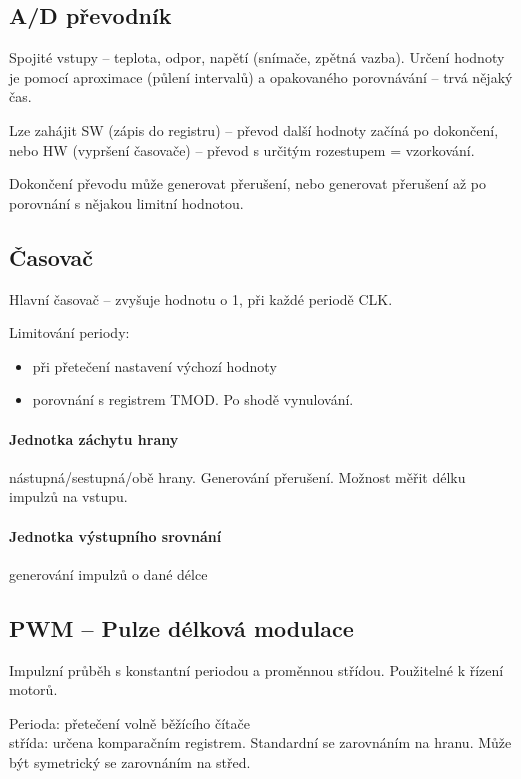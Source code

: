 \documentclass[a4paper, 11pt]{report}
\begin{document}
\subsection{A/D převodník}
Spojité vstupy -- teplota, odpor, napětí (snímače, zpětná vazba). Určení hodnoty je pomocí aproximace (půlení intervalů) a opakovaného porovnávání -- trvá nějaký čas.

Lze zahájit SW (zápis do registru) -- převod další hodnoty začíná po dokončení, nebo HW (vypršení časovače) -- převod s určitým rozestupem = vzorkování.

Dokončení převodu může generovat přerušení, nebo generovat přerušení až po porovnání s nějakou limitní hodnotou.

\subsection{Časovač}
Hlavní časovač -- zvyšuje hodnotu o 1, při každé periodě CLK.

Limitování periody: 
\begin{itemize}
	\item při přetečení nastavení výchozí hodnoty
	\item porovnání s registrem TMOD. Po shodě vynulování.
\end{itemize}

\paragraph{Jednotka záchytu hrany}
nástupná/sestupná/obě hrany. Generování přerušení. Možnost měřit délku impulzů na vstupu.

\paragraph{Jednotka výstupního srovnání}
generování impulzů o dané délce

\subsection{PWM -- Pulze délková modulace}
Impulzní průběh s konstantní periodou a proměnnou střídou. Použitelné k řízení motorů.

Perioda: přetečení volně běžícího čítače\\
střída: určena komparačním registrem. Standardní se zarovnáním na hranu. Může být symetrický se zarovnáním na střed.
\end{document}
